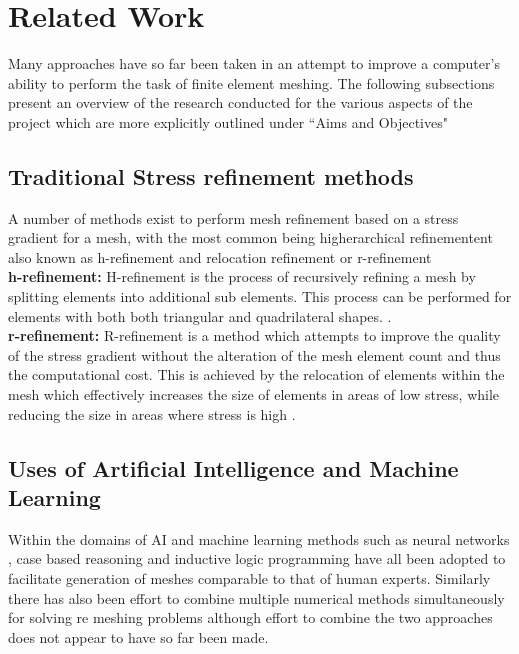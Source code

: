 \documentclass{article}
\begin{document}
\section{Related Work}

Many approaches have so far been taken in an attempt to improve a computer's ability to perform the task of finite element meshing. The following subsections present an overview of the research conducted for the various aspects of the project which are more explicitly outlined under ``Aims and Objectives"

\subsection{Traditional Stress refinement methods}

A number of methods exist to perform mesh refinement based on a stress gradient for a mesh, with the most common being higherarchical refinementent also known as h-refinement and relocation refinement or r-refinement\cite{HandPRefinements} \cite{RRefinement}\\ 

\noindent
\textbf{h-refinement: }
H-refinement is the process of recursively refining a mesh by splitting elements into additional sub elements. This process can be performed for elements with both both triangular and quadrilateral shapes. \cite{HandPRefinements}. \\ 

\noindent
\textbf{r-refinement: }
R-refinement is a method which attempts to improve the quality of the stress gradient without the alteration of the mesh element count and thus the computational cost. This is achieved by the relocation of elements within the mesh which effectively increases the size of elements in areas of low stress, while reducing the size in areas where stress is high \cite{RRefinement}.


\subsection{Uses of Artificial Intelligence and Machine Learning}

\noindent
Within the domains of AI and machine learning methods such as neural networks \cite{NeuralNetworks}, case based reasoning \cite{caseBasedReasoning} and inductive logic programming \cite{DolsakPaper94} have all been adopted to facilitate generation of meshes comparable to that of human experts.  Similarly there has also been effort to combine multiple numerical methods simultaneously for solving re meshing problems \cite{TraditionalHybridRefinement} although effort to combine the two approaches does not appear to have so far been made.\\ 
\end{document}

